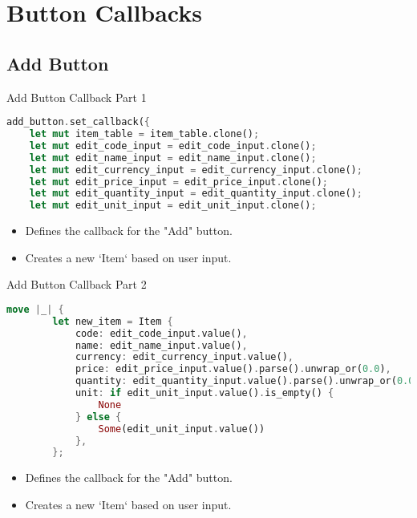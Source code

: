 \documentclass[aspectratio=169, table]{beamer}
\begin{document}
\section{Button Callbacks}
\subsection{Add Button}
\begin{frame}[fragile]{Add Button Callback Part 1}
\begin{lstlisting}[language=Rust]
add_button.set_callback({
	let mut item_table = item_table.clone();
	let mut edit_code_input = edit_code_input.clone();
	let mut edit_name_input = edit_name_input.clone();
	let mut edit_currency_input = edit_currency_input.clone();
	let mut edit_price_input = edit_price_input.clone();
	let mut edit_quantity_input = edit_quantity_input.clone();
	let mut edit_unit_input = edit_unit_input.clone();
\end{lstlisting}

\begin{itemize}
	\item Defines the callback for the "Add" button.
	\item Creates a new `Item` based on user input.
\end{itemize}
\end{frame}

\begin{frame}[fragile]{Add Button Callback Part 2}
\vspace{15pt}
\begin{lstlisting}[language=Rust]
	move |_| {
		let new_item = Item {
			code: edit_code_input.value(),
			name: edit_name_input.value(),
			currency: edit_currency_input.value(),
			price: edit_price_input.value().parse().unwrap_or(0.0),
			quantity: edit_quantity_input.value().parse().unwrap_or(0.0),
			unit: if edit_unit_input.value().is_empty() {
				None
			} else {
				Some(edit_unit_input.value())
			},
		};
	\end{lstlisting}
	
	\begin{itemize}
		\item Defines the callback for the "Add" button.
		\item Creates a new `Item` based on user input.
	\end{itemize}
\end{frame}
\end{document}
